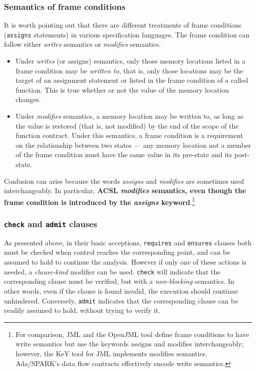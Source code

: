 \subsubsection{Semantics of frame conditions}
\label{sec:writesSemantics}
It is worth pointing out that there are different treatments of
frame conditions (\lstinline|assigns| statements) in various specification languages.
The frame condition can follow either \emph{writes} semantics or \emph{modifies} semantics.
\begin{itemize}
	\item Under \emph{writes} (or assigns) semantics, only those memory locations listed in a frame condition may be \emph{written to}, that is, only those locations may be the target of an assignment statement or listed in the frame condition of a called function. This is true whether or not the value of the memory location changes.
	\item Under \emph{modifies} semantics, a memory location may be written to, as long as the value is restored (that is, not modified) by the end of the scope of the function contract. Under this semantics, a frame condition is a requirement on the relationship between two states --- any memory location not a member of the frame condition must have the same value in its pre-state and its post-state.
\end{itemize}
Confusion can arise because the words \emph{assigns} and \emph{modifies} are sometimes used interchangeably. In particular, \textbf{ACSL  \iftoggle{isCPP}{use}{uses}
	\emph{modifies} semantics, even though the frame condition is introduced by the \emph{assigns} keyword}.\footnote{For comparison, JML and the OpenJML tool define frame conditions to have write semantics but use the keywords assigns and modifies interchangeably; however, the KeY tool for JML implements modifies semantics. Ada/SPARK's data flow contracts effectively encode write semantics.}

\subsubsection{\texorpdfstring{\lstinline|check|}{check} and \texorpdfstring{\lstinline|admit|}{admit} clauses}\label{sec:check-admit-clauses}

As presented above, in their basic acceptions, \lstinline|requires|
and \lstinline|ensures| clauses both must be checked when control reaches the
corresponding point, and can be assumed to hold to continue the analysis. However
if only one of these actions is needed, a {\it clause-kind} modifier can be used.
\lstinline|check| will indicate that the corresponding clause must be verified,
but with a \emph{non-blocking} semantics. In other words, even if the clause is found
invalid, the execution should continue unhindered. Conversely, \lstinline|admit|
indicates that the corresponding clause can be readily assumed to hold, without
trying to verify it.

